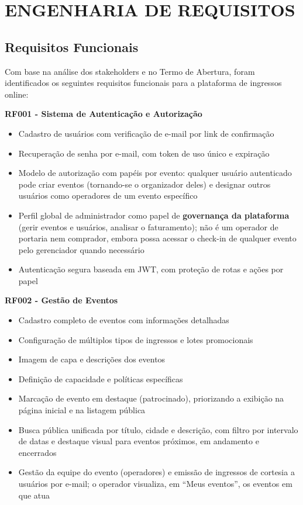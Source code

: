 \chapter{ENGENHARIA DE REQUISITOS}

\section{Requisitos Funcionais}

Com base na análise dos stakeholders e no Termo de Abertura, foram identificados os seguintes requisitos funcionais para a plataforma de ingressos online:

\textbf{RF001 - Sistema de Autenticação e Autorização}
\begin{itemize}
    \item Cadastro de usuários com verificação de e-mail por link de confirmação
    \item Recuperação de senha por e-mail, com token de uso único e expiração
    \item Modelo de autorização com papéis por evento: qualquer usuário autenticado pode criar eventos (tornando-se o organizador deles) e designar outros usuários como operadores de um evento específico
    \item Perfil global de administrador como papel de \textbf{governança da plataforma} (gerir eventos e usuários, analisar o faturamento); não é um operador de portaria nem comprador, embora possa acessar o check-in de qualquer evento pelo gerenciador quando necessário
    \item Autenticação segura baseada em JWT, com proteção de rotas e ações por papel
\end{itemize}

\textbf{RF002 - Gestão de Eventos}
\begin{itemize}
    \item Cadastro completo de eventos com informações detalhadas
    \item Configuração de múltiplos tipos de ingressos e lotes promocionais
    \item Imagem de capa e descrições dos eventos
    \item Definição de capacidade e políticas específicas
    \item Marcação de evento em destaque (patrocinado), priorizando a exibição na página inicial e na listagem pública
    \item Busca pública unificada por título, cidade e descrição, com filtro por intervalo de datas e destaque visual para eventos próximos, em andamento e encerrados
    \item Gestão da equipe do evento (operadores) e emissão de ingressos de cortesia a usuários por e-mail; o operador visualiza, em ``Meus eventos'', os eventos em que atua
\end{itemize}

